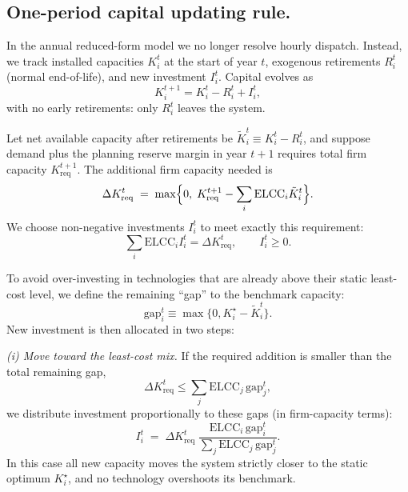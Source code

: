 \documentclass[preprint,authoryear,12pt]{elsarticle}
\begin{document}
\subsection{ One-period capital updating rule.}

In the annual reduced-form model we no longer resolve hourly dispatch.
Instead, we track installed capacities $K_i^t$ at the start of year $t$,
exogenous retirements $R_i^t$ (normal end-of-life), and new investment
$I_i^t$. Capital evolves as
\begin{equation}
K_i^{t+1} = K_i^t - R_i^t + I_i^t,
\end{equation}
with no early retirements: only $R_i^t$ leaves the system.

Let net available capacity after retirements be
$\tilde{K}_i^t \equiv K_i^t - R_i^t$, and suppose demand plus the
planning reserve margin in year $t\!+\!1$ requires total firm capacity
$K_{\mathrm{req}}^{t+1}$. The additional firm capacity needed is
\begin{equation}
\Delta K_{\mathrm{req}}^t
\;=\;
\max\Bigl\{
0,\;
K_{\mathrm{req}}^{t+1} - \sum_i \mathrm{ELCC}_i \tilde{K}_i^t
\Bigr\}.
\end{equation}
We choose non-negative investments $I_i^t$ to meet exactly this requirement:
\begin{equation}
\sum_i \mathrm{ELCC}_i I_i^t = \Delta K_{\mathrm{req}}^t,
\qquad I_i^t \ge 0.
\end{equation}

To avoid over-investing in technologies that are already above their
static least-cost level, we define the remaining ``gap'' to the benchmark
capacity:
\begin{equation}
\mathrm{gap}_i^t \equiv \max\{0, K_i^{\star} - \tilde{K}_i^t\}.
\end{equation}
New investment is then allocated in two steps:

\emph{(i) Move toward the least-cost mix.}
If the required addition is smaller than the total remaining gap,
\begin{equation}
\Delta K_{\mathrm{req}}^t \le \sum_j \mathrm{ELCC}_j\,\mathrm{gap}_j^t,
\end{equation}
we distribute investment proportionally to these gaps (in firm-capacity terms):
\begin{equation}
I_i^t
\;=\;
\Delta K_{\mathrm{req}}^t
\;\frac{\mathrm{ELCC}_i\,\mathrm{gap}_i^t}
     {\sum_j \mathrm{ELCC}_j\,\mathrm{gap}_j^t}.
\end{equation}
In this case all new capacity moves the system strictly closer to the
static optimum $K_i^{\star}$, and no technology overshoots its benchmark.
\end{document}
